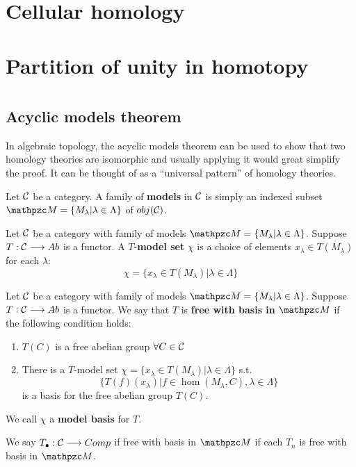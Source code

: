 \documentclass[11pt]{book} %
\begin{document}
\begin{proposition}
\begin{corollary}
\end{corollary}
\chapter{Cellular homology}
\chapter{Partition of unity in homotopy}
\appendix
\chapter{}
\section{Acyclic models theorem}
In algebraic topology, the acyclic models theorem can be used to show that two homology theories are isomorphic and usually applying it would great simplify the proof. It can be thought of as a ``universal pattern'' of homology theories.
\begin{definition}Let ${\cal C}$ be a category.
A family of \textbf{models} in ${\cal C}$ is simply an indexed subset $\pzm=\{M_\lambda|\lambda\in \Lambda\}$ of $obj({\cal C})$.
\end{definition}

\begin{definition}
Let ${\cal C}$ be a category with family of models $\pzm=\{M_\lambda|\lambda\in \Lambda\}$.  Suppose $T:{\cal C}\longrightarrow Ab$ is a functor. A $T$-\textbf{model set} $\chi$ is a choice of elements $x_\lambda\in T(M_\lambda)$ for each $\lambda$:
$$
\chi=\{x_\lambda\in T(M_\lambda)|\lambda\in \Lambda\}
$$
\end{definition}

\begin{definition}
Let ${\cal C}$ be a category with family of models $\pzm=\{M_\lambda|\lambda\in \Lambda\}$. Suppose $T:{\cal C}\longrightarrow Ab$ is a functor. We say that $T$ is \textbf{free with basis in} $\pzm$ if the following condition holds:
\begin{enumerate}
\item $T(C)$ is a free abelian group $\forall C\in {\cal C}$
\item There is a $T$-model set $\chi=\{x_\lambda\in T(M_\lambda)|\lambda\in \Lambda\}$ s.t.
$$
\{T(f)(x_\lambda)|f\in \hom(M_\lambda,C), \lambda\in \Lambda\}
$$
is a basis for the free abelian group $T(C)$.
\end{enumerate}
We call $\chi$ a \textbf{model basis} for $T$.
\end{definition}
We say $T_\bullet:{\cal C}\longrightarrow Comp$ if free with basis in $\pzm$ if each $T_n$ is free with basis in $\pzm$.


\end{proposition}
\end{document}
